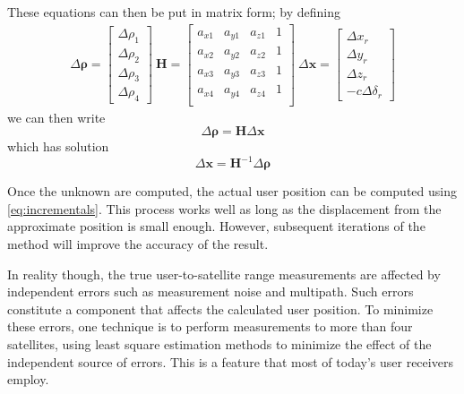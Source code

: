 These equations can then be put in matrix form; by defining
\[
  \begin{array}{l}
  \Delta \bm{\rho} = \begin{bmatrix}
    \Delta \rho_1 \\
    \Delta \rho_2 \\
    \Delta \rho_3 \\
    \Delta \rho_4
  \end{bmatrix}

  \>

  \bm{H} = \begin{bmatrix}
    a_{x1} & a_{y1} & a_{z1} & 1 \\
    a_{x2} & a_{y2} & a_{z2} & 1 \\
    a_{x3} & a_{y3} & a_{z3} & 1 \\
    a_{x4} & a_{y4} & a_{z4} & 1 \\
  \end{bmatrix}

  \>

  \Delta \bm{x} = \begin{bmatrix}
    \Delta x_r \\
    \Delta y_r \\
    \Delta z_r \\
    -c \Delta \delta_r
  \end{bmatrix}
  \end{array}
\]
we can then write
\begin{equation}
  \Delta \bm{\rho} = \bm{H} \Delta \bm{x}
\end{equation}
which has solution
\begin{equation}
  \Delta \bm{x} = \bm{H}^{-1} \Delta \bm{\rho}
\end{equation}

Once the unknown are computed, the actual user position can be computed using
\ref{eq:incrementals}. This process works well as long as the displacement from
the approximate position is small enough. However, subsequent iterations of the
method will improve the accuracy of the result.

In reality though, the true user-to-satellite range measurements are affected by
independent errors such as measurement noise and multipath. Such errors
constitute a component that affects the calculated user position. To minimize
these errors, one technique is to perform measurements to more than four
satellites, using least square estimation methods to minimize the effect of the
independent source of errors. This is a feature that most of today's user
receivers employ.

